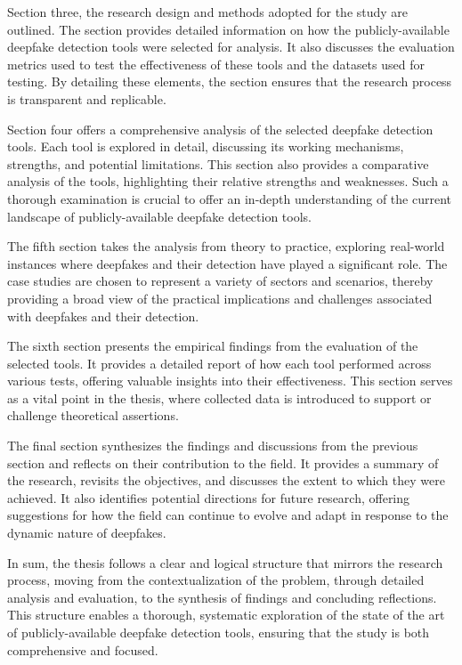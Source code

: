 Section three, the research design and methods adopted for the study are outlined. 
The section provides detailed information on how the publicly-available deepfake 
detection tools were selected for analysis. It also discusses the evaluation metrics 
used to test the effectiveness of these tools and the datasets used for testing. 
By detailing these elements, the section ensures that the research process is 
transparent and replicable.

Section four offers a comprehensive analysis of the selected deepfake detection tools. 
Each tool is explored in detail, discussing its working mechanisms, strengths, and 
potential limitations. This section also provides a comparative analysis of the tools, 
highlighting their relative strengths and weaknesses. Such a thorough examination is 
crucial to offer an in-depth understanding of the current landscape of publicly-available 
deepfake detection tools.

The fifth section takes the analysis from theory to practice, exploring real-world instances 
where deepfakes and their detection have played a significant role. The case studies 
are chosen to represent a variety of sectors and scenarios, thereby providing a broad 
view of the practical implications and challenges associated with deepfakes and their 
detection.

The sixth section presents the empirical findings from the evaluation of the selected tools. 
It provides a detailed report of how each tool performed across various tests, offering 
valuable insights into their effectiveness. This section serves as a vital point in the 
thesis, where collected data is introduced to support or challenge theoretical assertions.

The final section synthesizes the findings and discussions from the previous section and 
reflects on their contribution to the field. It provides a summary of the research, 
revisits the objectives, and discusses the extent to which they were achieved. It also 
identifies potential directions for future research, offering suggestions for how the 
field can continue to evolve and adapt in response to the dynamic nature of deepfakes.

In sum, the thesis follows a clear and logical structure that mirrors the research 
process, moving from the contextualization of the problem, through detailed analysis 
and evaluation, to the synthesis of findings and concluding reflections. This structure 
enables a thorough, systematic exploration of the state of the art of publicly-available 
deepfake detection tools, ensuring that the study is both comprehensive and focused.


